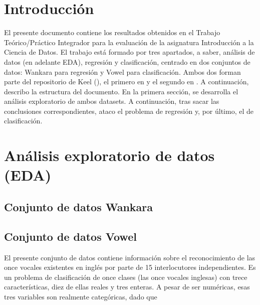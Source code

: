 
\section{Introducción}


El presente documento contiene los resultados obtenidos en el Trabajo Teórico/Práctico Integrador para la evaluación de la asignatura Introducción a la Ciencia de Datos. El trabajo está formado por tres apartados, a saber, análisis de datos (en adelante EDA), regresión y clasificación, centrado en dos conjuntos de datos: Wankara para regresión y Vowel para clasificación. Ambos dos forman parte del repositorio de Keel (\cite{keel}), el primero en \cite{wankara} y el segundo en \cite{vowel}. A continuación, describo la estructura del documento. En la primera sección, se desarrolla el análisis exploratorio de ambos datasets. A continuación, tras sacar las conclusiones correspondientes, ataco el problema de regresión y, por último, el de clasificación.







\section{Análisis exploratorio de datos (EDA)}

\subsection{Conjunto de datos Wankara}


\newpage
\subsection{Conjunto de datos Vowel}

El presente conjunto de datos contiene información sobre el reconocimiento de las once vocales existentes en inglés por parte de 15 interlocutores independientes. Es un problema de clasificación de once clases (las once vocales inglesas) con trece características, diez de ellas reales y tres enteras. A pesar de ser numéricas, esas tres variables son realmente categóricas, dado que

